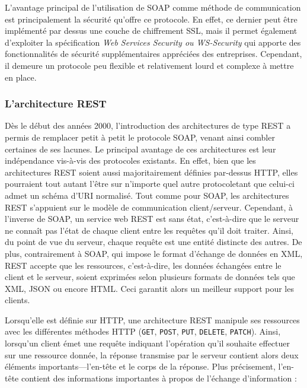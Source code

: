 L'avantage principal de l'utilisation de \ac{SOAP} comme méthode de communication est principalement la sécurité qu'offre ce protocole. En effet, ce dernier peut être implémenté par dessus une couche de chiffrement \ac{SSL}, mais il permet également d'exploiter la spécification \textit{Web Services Security ou WS-Security} qui apporte des fonctionnalités de sécurité supplémentaires appréciées des entreprises. Cependant, il demeure un protocole peu flexible et relativement lourd et complexe à mettre en place.

\subsubsection{L'architecture \ac{REST}}

Dès le début des années 2000, l'introduction des architectures de type \ac{REST} \citep{Fielding2000} a permis de remplacer petit à petit le protocole \ac{SOAP}, venant ainsi combler certaines de ses lacunes. Le principal avantage de ces architectures est leur indépendance vis-à-vis des protocoles existants. En effet, bien que les architectures \ac{REST} soient aussi majoritairement définies par-dessus \ac{HTTP}, elles pourraient tout autant l'être sur n'importe quel autre protocole\textemdash tant que celui-ci admet un schéma d'\ac{URI} normalisé. Tout comme pour \ac{SOAP}, les architectures \ac{REST} s'appuient sur le modèle de communication client/serveur. Cependant, à l'inverse de \ac{SOAP}, un service web \ac{REST} est sans état, c'est-à-dire que le serveur ne connaît pas l'état de chaque client entre les requêtes qu'il doit traiter. Ainsi, du point de vue du serveur, chaque requête est une entité distincte des autres. De plus, contrairement à \ac{SOAP}, qui impose le format d'échange de données en \ac{XML}, \ac{REST} accepte que les ressources, c'est-à-dire, les données échangées entre le client et le serveur, soient exprimées selon plusieurs formats de données tels que \ac{XML}, \ac{JSON} ou encore \ac{HTML}. Ceci garantit alors un meilleur support pour les clients.

Lorsqu'elle est définie sur \ac{HTTP}, une architecture \ac{REST} manipule ses ressources avec les différentes méthodes \ac{HTTP} (\texttt{GET}, \texttt{POST}, \texttt{PUT}, \texttt{DELETE}, \texttt{PATCH}). Ainsi, lorsqu'un client émet une requête indiquant l'opération qu'il souhaite effectuer sur une ressource donnée, la réponse transmise par le serveur contient alors deux éléments importants—l'en-tête et le corps de la réponse. Plus précisement, l'en-tête contient des informations importantes à propos de l’échange d’information :

